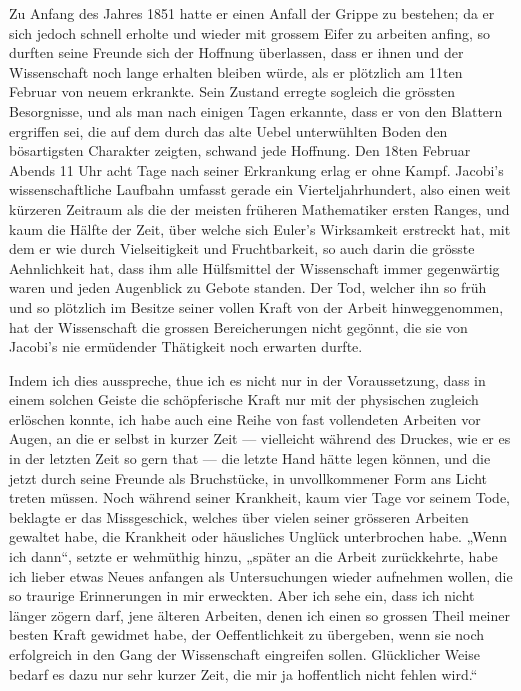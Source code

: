 \documentclass[11pt]{article}
\begin{document}
Zu Anfang des Jahres 1851 hatte er einen Anfall der Grippe zu bestehen; da er sich jedoch schnell erholte und wieder mit grossem Eifer zu arbeiten anfing, so durften seine Freunde sich der Hoffnung überlassen, dass er ihnen und der Wissenschaft noch lange erhalten bleiben würde, als er plötzlich am 11ten Februar von neuem erkrankte. Sein Zustand erregte sogleich die grössten Besorgnisse, und als man nach einigen Tagen erkannte, dass er von den Blattern ergriffen sei, die auf dem durch das alte Uebel unterwühlten Boden den bösartigsten Charakter zeigten, schwand jede Hoffnung. Den 18ten Februar Abends 11 Uhr acht Tage nach seiner Erkrankung erlag er ohne Kampf. Jacobi’s wissenschaftliche Laufbahn umfasst gerade ein Vierteljahrhundert, also einen weit kürzeren Zeitraum als die der meisten früheren Mathematiker ersten Ranges, und kaum die Hälfte der Zeit, über welche sich Euler’s Wirksamkeit erstreckt hat, mit dem er wie durch Vielseitigkeit und Fruchtbarkeit, so auch darin die grösste Aehnlichkeit hat, dass ihm alle Hülfsmittel der Wissenschaft immer gegenwärtig waren und jeden Augenblick zu Gebote standen. Der Tod, welcher ihn so früh und so plötzlich im Besitze seiner vollen Kraft von der Arbeit hinweggenommen, hat der Wissenschaft die grossen Bereicherungen nicht gegönnt, die sie von Jacobi’s nie ermüdender Thätigkeit noch erwarten durfte.

Indem ich dies ausspreche, thue ich es nicht nur in der Voraussetzung, dass in einem solchen Geiste die schöpferische Kraft nur mit der physischen zugleich erlöschen konnte, ich habe auch eine Reihe von fast vollendeten Arbeiten vor Augen, an die er selbst in kurzer Zeit — vielleicht während des Druckes, wie er es in der letzten Zeit so gern that — die letzte Hand hätte legen können, und die jetzt durch seine Freunde als Bruchstücke, in unvollkommener Form ans Licht treten müssen. Noch während seiner Krankheit, kaum vier Tage vor seinem Tode, beklagte er das Missgeschick, welches über vielen seiner grösseren Arbeiten gewaltet habe, die Krankheit oder häusliches Unglück unterbrochen habe. „Wenn ich dann“, setzte er wehmüthig hinzu, „später an die Arbeit zurückkehrte, habe ich lieber etwas Neues anfangen als Untersuchungen wieder aufnehmen wollen, die so traurige Erinnerungen in mir erweckten. Aber ich sehe ein, dass ich nicht länger zögern darf, jene älteren Arbeiten, denen ich einen so grossen Theil meiner besten Kraft gewidmet habe, der Oeffentlichkeit zu übergeben, wenn sie noch erfolgreich in den Gang der Wissenschaft eingreifen sollen. Glücklicher Weise bedarf es dazu nur sehr kurzer Zeit, die mir ja hoffentlich nicht fehlen wird.“
\end{document}
